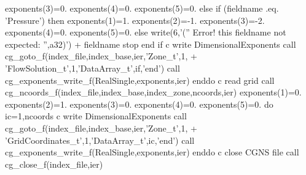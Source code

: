 \documentclass[12pt]{article}
\begin{document}
{\newline\indent\indent\indent          exponents(3)=0.
\newline\indent\indent\indent          exponents(4)=0.
\newline\indent\indent\indent          exponents(5)=0.
\newline\indent\indent        else if (fieldname .eq. 'Pressure') then
\newline\indent\indent\indent          exponents(1)=1.
\newline\indent\indent\indent          exponents(2)=-1.
\newline\indent\indent\indent          exponents(3)=-2.
\newline\indent\indent\indent          exponents(4)=0.
\newline\indent\indent\indent          exponents(5)=0.
\newline\indent\indent        else
\newline\indent\indent\indent          write(6,'('' Error! this fieldname not expected: '',a32)')
\newline + \indent\indent\indent     fieldname
\newline\indent\indent\indent          stop
\newline\indent\indent        end if
\newline c   write DimensionalExponents
\newline\indent\indent        call cg\_goto\_f(index\_file,index\_base,ier,'Zone\_t',1,
\newline + \indent\indent   'FlowSolution\_t',1,'DataArray\_t',if,'end')
\newline\indent\indent        call cg\_exponents\_write\_f(RealSingle,exponents,ier)
\newline\indent      enddo
\newline c   read grid
\newline\indent      call cg\_ncoords\_f(index\_file,index\_base,index\_zone,ncoords,ier)
\newline\indent      exponents(1)=0.
\newline\indent      exponents(2)=1.
\newline\indent      exponents(3)=0.
\newline\indent      exponents(4)=0.
\newline\indent      exponents(5)=0.
\newline\indent      do ic=1,ncoords
\newline c   write DimensionalExponents
\newline\indent\indent        call cg\_goto\_f(index\_file,index\_base,ier,'Zone\_t',1,
\newline + \indent\indent    'GridCoordinates\_t',1,'DataArray\_t',ic,'end')
\newline\indent\indent        call cg\_exponents\_write\_f(RealSingle,exponents,ier)
\newline\indent      enddo
\newline c   close CGNS file
\newline\indent      call cg\_close\_f(index\_file,ier)
}
\end{document}
